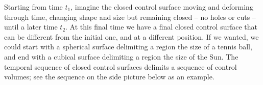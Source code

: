 \documentclass[a4paper,12pt,%
onecolumn,oneside,titlepage,%
british%
]{memoir}
\renewcommand*{\|}[1][]{\nonscript\:#1\vert\nonscript\:\mathopen{}}
\begin{document}
Starting from time $t_{1}$, imagine the closed control surface moving and deforming through time, changing shape and size but remaining closed -- no holes or cuts -- until a later time $t_{2}$. At this final time we have a final closed control surface that can be different from the initial one, and at a different position. If we wanted, we could start with a spherical surface delimiting a region the size of a tennis ball, and end with a cubical surface delimiting a region the size of the Sun. The temporal sequence of closed control surfaces delimits a sequence of control volumes; see the sequence on the side picture below as an example.
\end{document}

